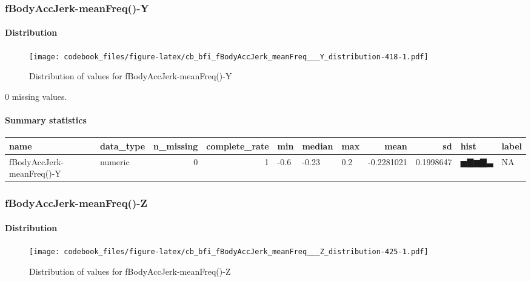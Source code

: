 \documentclass[
]{article}
\begin{document}
\hypertarget{fBodyAccJerk_meanFreq___Y}{%
\subsubsection{fBodyAccJerk-meanFreq()-Y}\label{fBodyAccJerk_meanFreq___Y}}

\hypertarget{fBodyAccJerk_meanFreq___Y_distribution}{%
\paragraph{Distribution}\label{fBodyAccJerk_meanFreq___Y_distribution}}

\begin{figure}
\centering
\texttt{[image: codebook\_files/figure-latex/cb\_bfi\_fBodyAccJerk\_meanFreq\_\_\_Y\_distribution-418-1.pdf]}
\caption{Distribution of values for fBodyAccJerk-meanFreq()-Y}
\end{figure}

0 missing values.

\hypertarget{fBodyAccJerk_meanFreq___Y_summary}{%
\paragraph{Summary statistics}\label{fBodyAccJerk_meanFreq___Y_summary}}

\begin{longtable}[]{@{}llrrlllrrll@{}}
\toprule
name & data\_type & n\_missing & complete\_rate & min & median & max &
mean & sd & hist & label \\
\midrule
\endhead
fBodyAccJerk-meanFreq()-Y & numeric & 0 & 1 & -0.6 & -0.23 & 0.2 &
-0.2281021 & 0.1998647 & ▅▇▆▇▃ & NA \\
\bottomrule
\end{longtable}

\hypertarget{fBodyAccJerk_meanFreq___Z}{%
\subsubsection{fBodyAccJerk-meanFreq()-Z}\label{fBodyAccJerk_meanFreq___Z}}

\hypertarget{fBodyAccJerk_meanFreq___Z_distribution}{%
\paragraph{Distribution}\label{fBodyAccJerk_meanFreq___Z_distribution}}

\begin{figure}
\centering
\texttt{[image: codebook\_files/figure-latex/cb\_bfi\_fBodyAccJerk\_meanFreq\_\_\_Z\_distribution-425-1.pdf]}
\caption{Distribution of values for fBodyAccJerk-meanFreq()-Z}
\end{figure}
\end{document}
